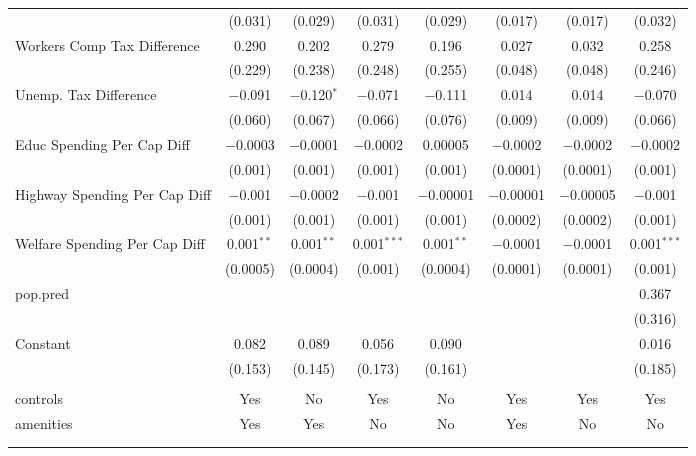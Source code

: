 \begin{table}[!htbp]
\begin{tabular}{@{\extracolsep{5pt}}lccccccc}
  & (0.031) & (0.029) & (0.031) & (0.029) & (0.017) & (0.017) & (0.032) \\ 
  Workers Comp Tax Difference & 0.290 & 0.202 & 0.279 & 0.196 & 0.027 & 0.032 & 0.258 \\ 
  & (0.229) & (0.238) & (0.248) & (0.255) & (0.048) & (0.048) & (0.246) \\ 
  Unemp. Tax Difference & $-$0.091 & $-$0.120$^{*}$ & $-$0.071 & $-$0.111 & 0.014 & 0.014 & $-$0.070 \\ 
  & (0.060) & (0.067) & (0.066) & (0.076) & (0.009) & (0.009) & (0.066) \\ 
  Educ Spending Per Cap Diff & $-$0.0003 & $-$0.0001 & $-$0.0002 & 0.00005 & $-$0.0002 & $-$0.0002 & $-$0.0002 \\ 
  & (0.001) & (0.001) & (0.001) & (0.001) & (0.0001) & (0.0001) & (0.001) \\ 
  Highway Spending Per Cap Diff & $-$0.001 & $-$0.0002 & $-$0.001 & $-$0.00001 & $-$0.00001 & $-$0.00005 & $-$0.001 \\ 
  & (0.001) & (0.001) & (0.001) & (0.001) & (0.0002) & (0.0002) & (0.001) \\ 
  Welfare Spending Per Cap Diff & 0.001$^{**}$ & 0.001$^{**}$ & 0.001$^{***}$ & 0.001$^{**}$ & $-$0.0001 & $-$0.0001 & 0.001$^{***}$ \\ 
  & (0.0005) & (0.0004) & (0.001) & (0.0004) & (0.0001) & (0.0001) & (0.001) \\ 
  pop.pred &  &  &  &  &  &  & 0.367 \\ 
  &  &  &  &  &  &  & (0.316) \\ 
  Constant & 0.082 & 0.089 & 0.056 & 0.090 &  &  & 0.016 \\ 
  & (0.153) & (0.145) & (0.173) & (0.161) &  &  & (0.185) \\ 
 \hline \\[-1.8ex] 
controls & Yes & No & Yes & No & Yes & Yes & Yes \\ 
amenities & Yes & Yes & No & No & Yes & No & No \\ 
\hline \\[-1.8ex] 
\hline 
\hline \\[-1.8ex] 
\end{tabular} 
\end{table} 

